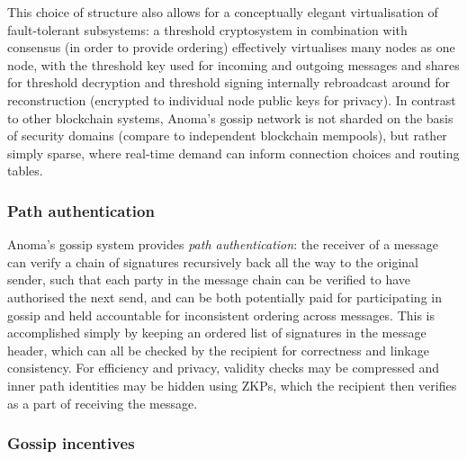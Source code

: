 \documentclass[
    9pt,            %
    commun,        %
    affiltop,       %
]{art}
\begin{document}
This choice of structure also allows for a conceptually elegant
virtualisation of fault-tolerant subsystems: a threshold cryptosystem in
combination with consensus (in order to provide ordering) effectively
virtualises many nodes as one node, with the threshold key used for
incoming and outgoing messages and shares for threshold decryption and
threshold signing internally rebroadcast around for reconstruction
(encrypted to individual node public keys for privacy). In contrast to
other blockchain systems, Anoma's gossip network is not
sharded on the basis of security domains (compare to independent
blockchain mempools), but rather simply sparse, where real-time demand
can inform connection choices and routing tables.

\subsubsection{Path authentication}\label{path-authentication}

Anoma's gossip system provides \emph{path
authentication}: the receiver of a message can verify a chain of
signatures recursively back all the way to the original sender, such
that each party in the message chain can be verified to have authorised
the next send, and can be both potentially paid for participating in
gossip and held accountable for inconsistent ordering across messages.
This is accomplished simply by keeping an ordered list of signatures in
the message header, which can all be checked by the recipient for
correctness and linkage consistency. For efficiency and privacy,
validity checks may be compressed and inner path identities may be
hidden using ZKPs, which the recipient then verifies as a part of
receiving the message.

\subsubsection{Gossip incentives}\label{gossip-incentives}
\end{document}
